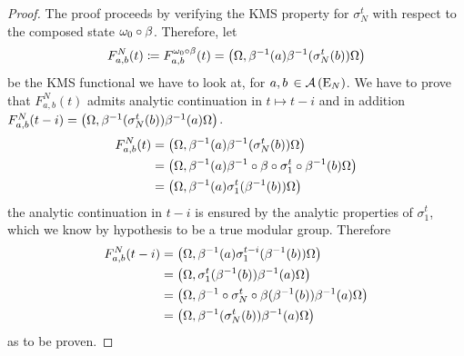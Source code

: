 \begin{proof}
The proof proceeds by verifying the \ac{KMS} property
for $\sigma_N^t$ with respect to the composed state
$\vac\circ\beta$. Therefore, let 
\[
F^N_{a,b}(t)\coloneqq F^{\vac\circ\beta}_{a,b}(t)=
\scal*{\Omega,\beta^{-1}(a)\beta^{-1}(\sigma_N^t(b))\Omega}
\]
be the \ac{KMS} functional we have to look at, for
$a,b\,\in\alg{\textrm{E}_N}$.
We have to prove that $F^N_{a,b}(t)$ admits 
analytic continuation in $t\mapsto t-i$ and in addition
$F^N_{a,b}(t-i)=
\scal*{\Omega,\beta^{-1}(\sigma_N^t(b))\beta^{-1}(a)\Omega}$.
\begin{align*}
F^N_{a,b}(t)&=\scal*{\Omega,\beta^{-1}(a)
\beta^{-1}(\sigma_N^t(b))\Omega}\\
&=\scal*{\Omega,\beta^{-1}(a)\beta^{-1}\circ\beta
\circ\sigma_1^t\circ\beta^{-1}(b)\Omega}\\
&=\scal*{\Omega,\beta^{-1}(a)
\sigma_1^t(\beta^{-1}(b))\Omega}
\end{align*}
the analytic continuation in $t-i$ is ensured
by the analytic properties of $\sigma_1^t$, which
we know by hypothesis to be a true modular group.
Therefore 
\begin{align*}
F^N_{a,b}(t-i)&=\scal*{\Omega,\beta^{-1}(a)
\sigma_1^{t-i}(\beta^{-1}(b))\Omega}\\
&=\scal*{\Omega,\sigma_1^{t}(\beta^{-1}(b))
\beta^{-1}(a)\Omega}\\
&=\scal*{\Omega,\beta^{-1}\circ\sigma^t_N\circ
\beta(\beta^{-1}(b))\beta^{-1}(a)\Omega}\\
&=\scal*{\Omega,\beta^{-1}(\sigma_N^t(b))
\beta^{-1}(a)\Omega}
\end{align*}
as to be proven. \qedhere
\end{proof}

